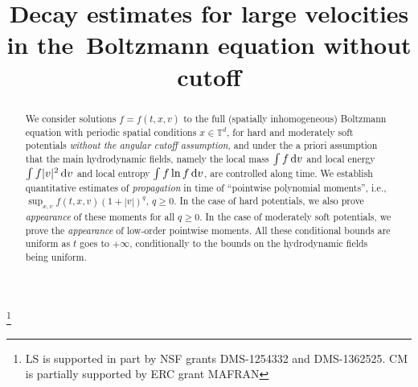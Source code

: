 \documentclass[JEP,XML,SOM,Unicode,NoFloatCountersInSection]{cedram}
\theoremstyle{plain}
\theoremstyle{definition}
\numberwithin{equation}{section}
\begin{document}
\frontmatter

\title[Decay estimates in the Boltzmann without cutoff]{Decay
estimates for large velocities in the~Boltzmann equation without
cutoff}

\author[\initial{C.} \lastname{Imbert}]{ }
\address{CNRS \& Department of Mathematics and
Applications, École Normale Supérieure (Paris) \\
45 rue d'Ulm, 75005 Paris, France}

\author[\initial{C.} \lastname{Mouhot}]{ }
\address{University of Cambridge,
DPMMS, Centre for Mathematical Sciences,\\
Wilberforce road, Cambridge CB3 0WA, UK}

\author[\initial{L.} \lastname{Silvestre}]{ }
\address[L.~Silvestre]{Mathematics
Department, University of Chicago,\\
Chicago, Illinois 60637, USA}

\thanks{LS is supported in part by NSF grants DMS-1254332 and
DMS-1362525.
CM is partially supported by ERC grant MAFRAN}

\begin{abstract}
We consider solutions $f=f(t,x,v)$ to the full (spatially inhomogeneous) Boltzmann equation with periodic spatial conditions $x \in \mathbb T^d$, for hard and moderately soft potentials \emph{without the angular cutoff assumption}, and under the a priori assumption that the main hydro\-dynamic fields, namely the local mass $\int f \, {\rm d}v$ and local energy $\int f |v|^2 \, {\rm d}v$ and local entropy $\int f \ln f \, {\rm d}v$, are controlled along time. We establish quantitative estimates of \emph{propagation} in time of ``pointwise polynomial moments'', i.e., $\sup_{x,v} f(t,x,v) (1+|v|)^q$, $q \ge 0$. In the case of hard potentials, we also prove \emph{appearance} of these moments for all $q \ge 0$. In the case of moderately soft potentials, we prove the \emph{appearance} of low-order pointwise moments. All these conditional bounds are uniform as $t$ goes to $+\infty$, conditionally to the bounds on the hydrodynamic fields being uniform.
\end{abstract}

\end{document}
